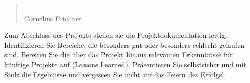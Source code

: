 \renewcommand*{\authorOfNextLines}{Helmut Quinz}
\begin{quote}
	\\
	\small{Cornelius Fitchner}
\end{quote}
Zum Abschluss des Projekts stellen sie die Projektdokumentation fertig.
Identifizieren Sie Bereiche, die besonders gut oder besonders schlecht gelaufen sind.
Bereiten Sie die über das Projekt hinaus relevanten Erkenntnisse für künftige Projekte auf (Lessons Learned).
Präsentieren Sie selbstsicher und mit Stolz die Ergebnisse und vergessen Sie nicht auf das Feiern des Erfolgs!

